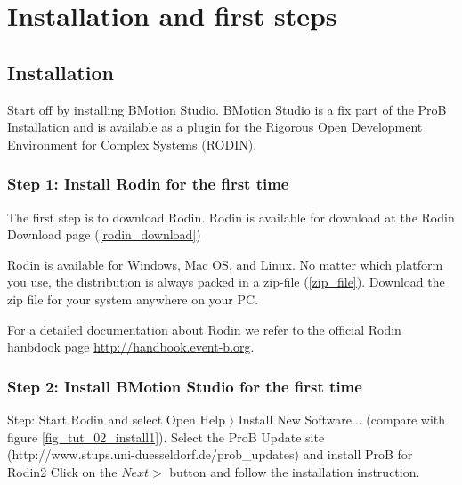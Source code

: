 \section{Installation and first steps}
\label{tutorial_02}

\subsection{Installation}

Start off by installing BMotion Studio. BMotion Studio is a fix part of the ProB Installation and is available as a plugin for the Rigorous Open Development Environment for Complex Systems (RODIN).

\subsubsection{Step 1: Install Rodin for the first time}


The first step is to download Rodin. Rodin is available for download at the Rodin Download page (\ref{rodin_download})

Rodin is available for Windows, Mac OS, and Linux.  No matter which platform you use, the distribution is always packed in a zip-file (\ref{zip_file}).  Download the zip file for your system anywhere on your PC.


For a detailed documentation about Rodin we refer to the official Rodin hanbdook page \href{http://handbook.event-b.org}{http://handbook.event-b.org}.

\subsubsection{Step 2: Install BMotion Studio for the first time}

Step: Start Rodin and select \textsf{Open Help $\rangle$ Install New Software...} (compare with figure \ref{fig_tut_02_install1}). Select the ProB Update site (http://www.stups.uni-duesseldorf.de/prob\_updates) and install ProB for Rodin2 Click on the \textsf{$Next >$} button and follow the installation instruction.

